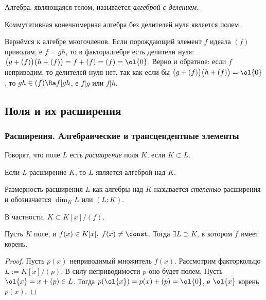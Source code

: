 \documentclass[a4paper]{article}
\begin{document}
\begin{df}
Алгебра, являющаяся телом, называется \emph{алгеброй с делением}.
\end{df}
Коммутативная конечномерная алгебра без делителей нуля является полем.

Вернёмся к алгебре многочленов. Если порождающий элемент $f$ идеала $(f)$ приводим, е $f=gh$, то в
факторалгебре есть делители нуля: $\bigl(g+(f)\bigr)\bigl(h+(f)\bigr)=f+(f) = (f)=\ol{0}.$ Верно и обратное:
если $f$ неприводим, то делителей нуля нет, так как если бы $\bigl(g+(f)\bigr)\bigl(h+(f)\bigr)=\ol{0}$, то
$gh \in (f) \Ra f | gh$, е $f|g$ или $f|h$.

\subsection{Поля и их расширения}

\subsubsection{Расширения. Алгебраические и трансцендентные элементы}

\begin{df}
Говорят, что поле $L$ есть \emph{расширение} поля $K$, если $K \subset L$.
\end{df}

Если $L$ расширение $K$, то $L$ является алгеброй над $K$.

\begin{df}
Размерность расширения $L$ как алгебры над $K$ называется \emph{степенью} расширения и обозначается
$\dim_KL$ или $(L:K)$.
\end{df}

В частности, $K \subset K[x]\bigl/(f)$.

\begin{theorem}
\label{FieldExtRootExistsTheorem}
Пусть $K$ поле, и $f(x) \in K[x], \; f(x) \neq \const$. Тогда $\exi L \supset K$, в котором  $f$
имеет корень.
\end{theorem}
\begin{proof}
Пусть $p(x)$ неприводимый множитель $f(x)$. Рассмотрим факторкольцо $L:=K[x]\bigl/(p)$. В силу
неприводимости $p$ оно будет полем. Пусть $\ol{x} = x + (p) \in L$. Тогда $p(\ol{x})=p(x) + (p) = \ol{0}$,
е $\ol{x}$ корень $p(x)$.
\end{proof}
\end{document}
